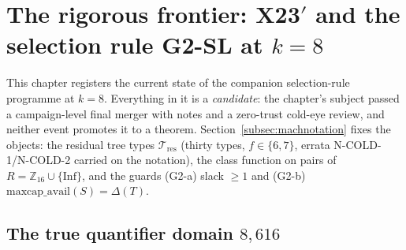 \section{The rigorous frontier: X23$'$ and the selection rule G2-SL at
$k=8$}\label{sec:attack}

This chapter registers the current state of the companion selection-rule programme at $k=8$.
Everything in it is a \emph{candidate}: the chapter's subject passed a campaign-level final
merger with notes and a zero-trust cold-eye review, and neither event promotes it to a
theorem. Section~\ref{subsec:machnotation} fixes the objects: the residual tree types
$\mathcal{T}_{\mathrm{res}}$ (thirty types, $f\in\{6,7\}$, errata N-COLD-1/N-COLD-2 carried
on the notation), the class function on pairs of $R=\mathbb{Z}_{16}\cup\{\mathrm{Inf}\}$, and
the guards (G2-a) slack $\ge1$ and (G2-b) $\mathrm{maxcap\_avail}(S)=\Delta(T)$.

\subsection{The true quantifier domain \texorpdfstring{$8{,}616$}{8616}}\label{subsec:attackdomain}

